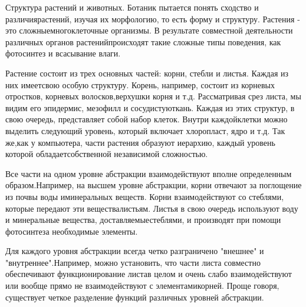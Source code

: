 \documentclass[10pt]{article}
\begin{document}
Структура растений и животных. Ботаник пытается понять сходство и различия\linebreak растений, изучая их морфологию, то есть форму и структуру. Растения - это сложные\linebreak многоклеточные организмы. В результате совместной деятельности различных органов растений\linebreak происходят такие сложные типы поведения, как фотосинтез и всасывание влаги. 

Растение состоит из трех основных частей: корни, стебли и листья. Каждая из них имеет\linebreak свою особую структуру. Корень, например, состоит из корневых отростков, корневых волосков,\linebreak верхушки корня и т.д. Рассматривая срез листа, мы видим его эпидермис, мезофилл и сосудистую\linebreak ткань. Каждая из этих структур, в свою очередь, представляет собой набор клеток. Внутри каждой\linebreak клетки можно выделить следующий уровень, который включает хлоропласт, ядро и т.д. Так же,\linebreak как у компьютера, части растения образуют иерархию, каждый уровень которой обладает\linebreak собственной независимой сложностью. 

Все части на одном уровне абстракции взаимодействуют вполне определенным образом.\linebreak Например, на высшем уровне абстракции, корни отвечают за поглощение из почвы воды и\linebreak минеральных веществ. Корни взаимодействуют со стеблями, которые передают эти вещества\linebreak листьям. Листья в свою очередь используют воду и минеральные вещества, доставляемые\linebreak стеблями, и производят при помощи фотосинтеза необходимые элементы. 

Для каждого уровня абстракции всегда четко разграничено "внешнее" и "внутреннее".\linebreak Например, можно установить, что части листа совместно обеспечивают функционирование листа\linebreak в целом и очень слабо взаимодействуют или вообще прямо не взаимодействуют с элементами\linebreak корней. Проще говоря, существует четкое разделение функций различных уровней абстракции. 
\end{document}
